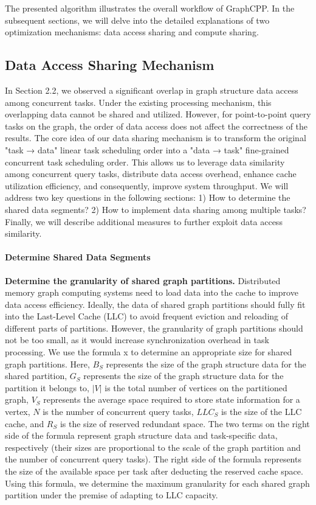 \documentclass[lettersize,journal]{IEEEtran} %
\begin{document}
The presented algorithm illustrates the overall workflow of GraphCPP. In the subsequent sections, we will delve into the detailed explanations of two optimization mechanisms: data access sharing and compute sharing.

\subsection{Data Access Sharing Mechanism}
In Section 2.2, we observed a significant overlap in graph structure data access among concurrent tasks. Under the existing processing mechanism, this overlapping data cannot be shared and utilized. However, for point-to-point query tasks on the graph, the order of data access does not affect the correctness of the results. The core idea of our data sharing mechanism is to transform the original "task → data" linear task scheduling order into a "data → task" fine-grained concurrent task scheduling order. This allows us to leverage data similarity among concurrent query tasks, distribute data access overhead, enhance cache utilization efficiency, and consequently, improve system throughput. We will address two key questions in the following sections: 1) How to determine the shared data segments? 2) How to implement data sharing among multiple tasks? Finally, we will describe additional measures to further exploit data access similarity.

\paragraph{Determine Shared Data Segments}

{\bf{Determine the granularity of shared graph partitions.}} Distributed memory graph computing systems need to load data into the cache to improve data access efficiency. Ideally, the data of shared graph partitions should fully fit into the Last-Level Cache (LLC) to avoid frequent eviction and reloading of different parts of partitions. However, the granularity of graph partitions should not be too small, as it would increase synchronization overhead in task processing. We use the formula x to determine an appropriate size for shared graph partitions. Here, $B_S$ represents the size of the graph structure data for the shared partition, $G_S$ represents the size of the graph structure data for the partition it belongs to, $|V|$ is the total number of vertices on the partitioned graph, $V_S$ represents the average space required to store state information for a vertex, $N$ is the number of concurrent query tasks, $LLC_S$ is the size of the LLC cache, and $R_S$ is the size of reserved redundant space. The two terms on the right side of the formula represent graph structure data and task-specific data, respectively (their sizes are proportional to the scale of the graph partition and the number of concurrent query tasks). The right side of the formula represents the size of the available space per task after deducting the reserved cache space. Using this formula, we determine the maximum granularity for each shared graph partition under the premise of adapting to LLC capacity.
\end{document}
